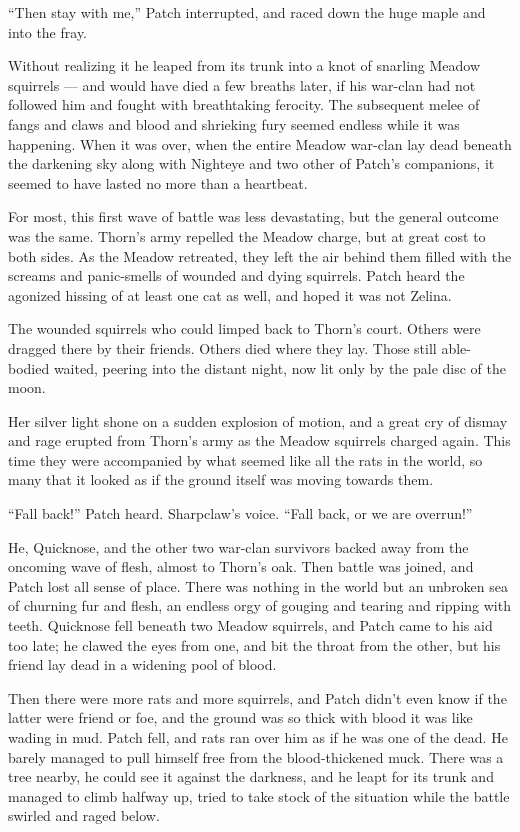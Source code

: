 \documentclass[ebook,oneside,openany,12pt]{memoir}
\begin{document}
“Then stay with me,” Patch interrupted, and raced down the huge maple
and into the fray.

Without realizing it he leaped from its trunk into a knot of snarling
Meadow squirrels — and would have died a few breaths later, if his
war-clan had not followed him and fought with breathtaking
ferocity. The subsequent melee of fangs and claws and blood and
shrieking fury seemed endless while it was happening. When it was
over, when the entire Meadow war-clan lay dead beneath the darkening
sky along with Nighteye and two other of Patch’s companions, it seemed
to have lasted no more than a heartbeat.

For most, this first wave of battle was less devastating, but the
general outcome was the same. Thorn’s army repelled the Meadow charge,
but at great cost to both sides. As the Meadow retreated, they left
the air behind them filled with the screams and panic-smells of
wounded and dying squirrels. Patch heard the agonized hissing of at
least one cat as well, and hoped it was not Zelina.

The wounded squirrels who could limped back to Thorn’s court. Others
were dragged there by their friends. Others died where they lay. Those
still able-bodied waited, peering into the distant night, now lit only
by the pale disc of the moon.

Her silver light shone on a sudden explosion of motion, and a great
cry of dismay and rage erupted from Thorn’s army as the Meadow
squirrels charged again. This time they were accompanied by what
seemed like all the rats in the world, so many that it looked as if
the ground itself was moving towards them.

“Fall back!” Patch heard. Sharpclaw’s voice. “Fall back, or we are
overrun!”

He, Quicknose, and the other two war-clan survivors backed away from
the oncoming wave of flesh, almost to Thorn’s oak. Then battle was
joined, and Patch lost all sense of place. There was nothing in the
world but an unbroken sea of churning fur and flesh, an endless orgy
of gouging and tearing and ripping with teeth. Quicknose fell beneath
two Meadow squirrels, and Patch came to his aid too late; he clawed
the eyes from one, and bit the throat from the other, but his friend
lay dead in a widening pool of blood.

Then there were more rats and more squirrels, and Patch didn’t even
know if the latter were friend or foe, and the ground was so thick
with blood it was like wading in mud. Patch fell, and rats ran over
him as if he was one of the dead. He barely managed to pull himself
free from the blood-thickened muck. There was a tree nearby, he could
see it against the darkness, and he leapt for its trunk and managed to
climb halfway up, tried to take stock of the situation while the
battle swirled and raged below.
\end{document}
